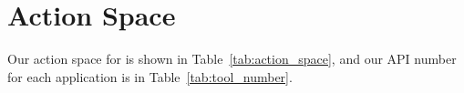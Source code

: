 \section{Action Space}\label{apdx:action_space}
Our action space for \model is shown in Table~\ref{tab:action_space}, and our API number for each application is in Table~\ref{tab:tool_number}.





\newpage
